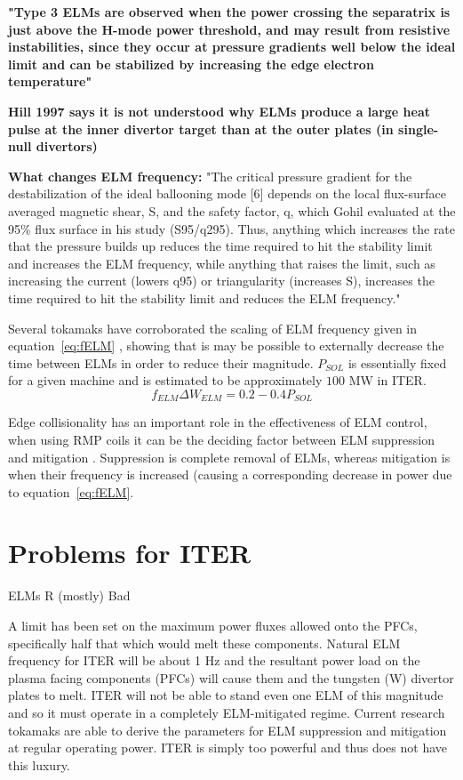 \documentclass[12pt]{article}  %
\begin{document}
\textbf{"Type 3 ELMs are observed when the power crossing the separatrix is just above the H-mode power threshold, and may result from resistive instabilities, since they occur at pressure gradients well below the ideal limit and can be stabilized by increasing the edge electron temperature"} \cite{Hill1997}

\textbf{Hill 1997 \cite{Hill1997} says it is not understood why ELMs produce a large heat pulse at the inner divertor target than at the outer plates (in single-null divertors)}

\textbf{What changes ELM frequency:}
"The critical pressure gradient for the destabilization of the ideal ballooning mode [6] depends on the local flux-surface averaged magnetic shear, S, and the safety factor, q, which Gohil evaluated at the 95\% flux surface in his study (S95/q295). Thus, anything which increases the rate that the pressure builds up reduces the time required to hit the stability limit and increases the ELM frequency, while anything that raises the limit, such as increasing the current (lowers q95) or triangularity (increases S), increases the time required to hit the stability limit and reduces the ELM frequency."\cite{Hill1997}

Several tokamaks have corroborated the scaling of ELM frequency given in equation~\ref{eq:fELM} \cite{Leonard1999}\cite{Loarte2002}, showing that is may be possible to externally decrease the time between ELMs in order to reduce their magnitude. $P_{SOL}$ is essentially fixed for a given machine and is estimated to be approximately $100$ MW in ITER.\cite{Eich2013}
\begin{equation}\label{eq:fELM}
f_{ELM}\Delta W_{ELM} = 0.2-0.4 P_{SOL}
\end{equation}

Edge collisionality has an important role in the effectiveness of ELM control, when using RMP coils it can be the deciding factor between ELM suppression and mitigation \cite{Kirk2013}. Suppression is complete removal of ELMs, whereas mitigation is when their frequency is increased (causing a corresponding decrease in power due to equation~\ref{eq:fELM}.


\section{Problems for ITER}\label{sec:Problems}
ELMs R (mostly) Bad \cite{Connor2008}

A limit has been set on the maximum power fluxes allowed onto the PFCs, specifically half that which would melt these components.\cite{Loarte2014a} Natural ELM frequency for ITER will be about 1 Hz and the resultant power load on the plasma facing components (PFCs) will cause them and the tungsten (W) divertor plates to melt\cite{Federici2003}. ITER will not be able to stand even one ELM of this magnitude and so it must operate in a completely ELM-mitigated regime\cite{KirkFF}. Current research tokamaks are able to derive the parameters for ELM suppression and mitigation at regular operating power. ITER is simply too powerful and thus does not have this luxury.
\end{document}
